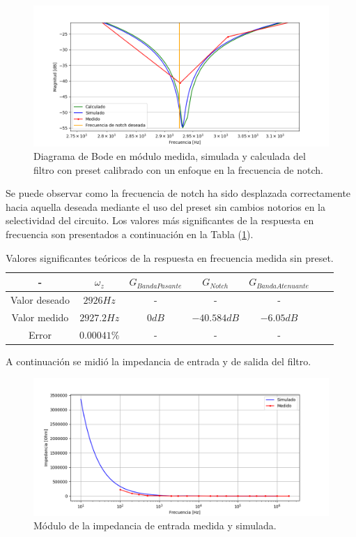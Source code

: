 \begin{figure}[H]
	\centering
	\includegraphics[width=\textwidth]{Imagenes1/bode_calc_sim_med_calibrado_notch.PNG}
	\caption{Diagrama de Bode en módulo medida, simulada y calculada del filtro con preset calibrado con un enfoque en la frecuencia de notch.}
	\label{fig:bode_calc_sim_med_cal_notch}
\end{figure}


Se puede observar como la frecuencia de notch ha sido desplazada correctamente hacia aquella deseada mediante el uso del preset sin cambios notorios en la selectividad del circuito. Los valores más significantes de la respuesta en frecuencia son presentados a continuación en la Tabla (\ref{tab:rta_freq_med_conpreset}).

\begin{table}[H]
\centering
\begin{tabular}{@{}ccccccc@{}}
\toprule
- & $\omega_z$ & $G_{Banda Pasante}$  & $G_{Notch}$ & $G_{Banda Atenuante}$ \\ \midrule
Valor deseado & $2926Hz$ & - & - & - \\
Valor medido & $2927.2Hz$ & $0dB$ & $-40.584dB$ & $-6.05dB$ \\
Error & $0.00041\%$ & - & - & - \\ \bottomrule
\end{tabular}
\caption{Valores significantes teóricos de la respuesta en frecuencia medida sin preset.}
\label{tab:rta_freq_med_conpreset}
\end{table}

A continuación se midió la impedancia de entrada y de salida del filtro.

\begin{figure}[H]
	\centering
	\includegraphics[width=\textwidth]{Imagenes1/gic_zin_calibrado.png}
	\caption{Módulo de la impedancia de entrada medida y simulada.}
	\label{fig:bode_calc_sim_med_cal}
\end{figure}

